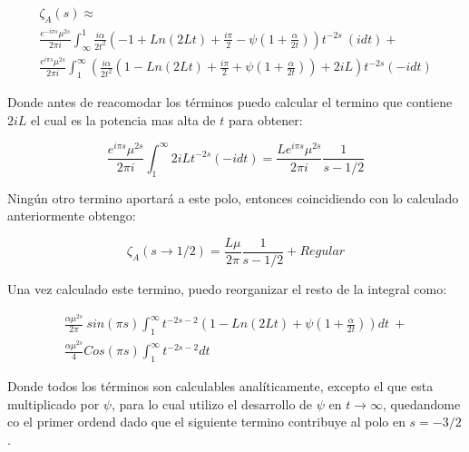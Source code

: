 \begin{equation}
\begin{array}{c}
    \zeta _A (s) \approx \\
     \frac{e^{-i \pi s} \mu ^{2s}}{2 \pi i} \int _{\infty} ^{1}
     \frac{ i \alpha}{2 t^2}
     \left(
     - 1 + Ln(2 L t) + \frac{i \pi}{2}  - \psi (1+\frac{\alpha}{2 t})
     \right)
     t^{-2 s}
      \ 
     (i dt) + \\
     \frac{e^{i \pi s} \mu ^{2s}}{2 \pi i} \int _1 ^{\infty}
	\left(      
     \frac{ i \alpha}{2  t^2}
     \left(
     1 - Ln(2 L t) + \frac{i \pi}{2} + \psi (1 + \frac{\alpha}{2 t}) 
      
     \right)
     + 2 i L
     \right)
     t^{-2 s}
     (-i dt)
     
\end{array}
\end{equation}

Donde antes de reacomodar los términos puedo calcular el termino que contiene $2iL$ el cual es la potencia mas alta de $t$ para obtener: 

\begin{equation}
    \frac{e^{i \pi s} \mu ^{2s} }{2 \pi i }
    \int _1 ^{\infty}
    2 i L    
    t ^{-2 s}
    (-i dt) =  
    \frac{L e^{i \pi s} \mu ^{2s}}{2 \pi i} \frac{1}{s-1/2   }
\end{equation}

Ningún otro termino aportará a este polo, entonces coincidiendo con lo calculado anteriormente obtengo:

\begin{equation}
    \zeta _A  (s \rightarrow 1/2) = \frac{L \mu }{2 \pi} \frac{1}{s- 1/2 } + Regular
\end{equation}


Una vez calculado este termino, puedo reorganizar el resto de la integral como:

\begin{equation}
\begin{array}{c}
    \frac{\alpha \mu ^{2s} }{2 \pi} \ sin(\pi s)
    \int _1 ^{\infty}
    t ^{-2 s-2} 
    \left(
    1 - Ln(2Lt) + \psi (1 + \frac{\alpha}{2t})
    \right) dt \ + \\ 
    \frac{\alpha \mu ^{2s} }{4} 
    Cos(\pi s)
    \int _1 ^{\infty} t^{-2s-2} dt
\end{array}
\end{equation}

Donde todos los términos son calculables analíticamente, excepto el que esta multiplicado por $\psi$, para lo cual utilizo el desarrollo de $\psi$ en $t \rightarrow \infty$, quedandome co el primer ordend dado que el siguiente termino contribuye al polo en $s = -3/2$.


